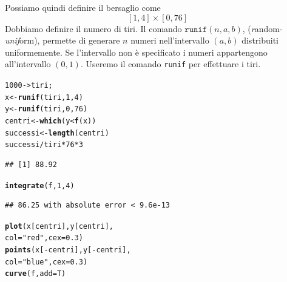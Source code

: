 \documentclass[onecolumn,11pt]{book}\usepackage[]{graphicx}\usepackage[]{color}
\makeatletter
\newcommand{\hlnum}[1]{\textcolor[rgb]{0.686,0.059,0.569}{#1}}%
\newcommand{\hlstr}[1]{\textcolor[rgb]{0.192,0.494,0.8}{#1}}%
\newcommand{\hlopt}[1]{\textcolor[rgb]{0,0,0}{#1}}%
\newcommand{\hlstd}[1]{\textcolor[rgb]{0.345,0.345,0.345}{#1}}%
\newcommand{\hlkwb}[1]{\textcolor[rgb]{0.69,0.353,0.396}{#1}}%
\newcommand{\hlkwc}[1]{\textcolor[rgb]{0.333,0.667,0.333}{#1}}%
\newcommand{\hlkwd}[1]{\textcolor[rgb]{0.737,0.353,0.396}{\textbf{#1}}}%
\newenvironment{kframe}{%
 \def\at@end@of@kframe{}%
 \ifinner\ifhmode%
  \def\at@end@of@kframe{\end{minipage}}%
  \begin{minipage}{\columnwidth}%
 \fi\fi%
 \def\FrameCommand##1{\hskip\@totalleftmargin \hskip-\fboxsep
 \colorbox{shadecolor}{##1}\hskip-\fboxsep
     \hskip-\linewidth \hskip-\@totalleftmargin \hskip\columnwidth}%
 \MakeFramed {\advance\hsize-\width
   \@totalleftmargin\z@ \linewidth\hsize
   \@setminipage}}%
 {\par\unskip\endMakeFramed%
 \at@end@of@kframe}
\newenvironment{knitrout}{}{} %
\makeatother
\begin{document}
Possiamo quindi definire il bersaglio come
$$[1,4]\times [0,76]$$
Dobbiamo definire il numero di tiri.
Il comando $\texttt{runif}(n,a,b)$, ({\it r}andom-{\it unif}orm), permette di generare $n$ numeri nell'intervallo $(a,b)$ distribuiti uniformemente. Se l'intervallo non \`e specificato i numeri appartengono all'intervallo $(0,1)$.
Useremo il comando  \texttt{runif} per effettuare i tiri.

\par
\begin{knitrout}
\color{fgcolor}\begin{kframe}
\begin{alltt}
\hlnum{1000}\hlkwb{->}\hlstd{tiri;}
\hlstd{x}\hlkwb{<-}\hlkwd{runif}\hlstd{(tiri,}\hlnum{1}\hlstd{,}\hlnum{4}\hlstd{)}
\hlstd{y}\hlkwb{<-}\hlkwd{runif}\hlstd{(tiri,}\hlnum{0}\hlstd{,}\hlnum{76}\hlstd{)}
\hlstd{centri}\hlkwb{<-}\hlkwd{which}\hlstd{(y}\hlopt{<}\hlkwd{f}\hlstd{(x))}
\hlstd{successi}\hlkwb{<-}\hlkwd{length}\hlstd{(centri)}
\hlstd{successi}\hlopt{/}\hlstd{tiri}\hlopt{*}\hlnum{76}\hlopt{*}\hlnum{3}
\end{alltt}
\begin{verbatim}
## [1] 88.92
\end{verbatim}
\begin{alltt}
\hlkwd{integrate}\hlstd{(f,}\hlnum{1}\hlstd{,}\hlnum{4}\hlstd{)}
\end{alltt}
\begin{verbatim}
## 86.25 with absolute error < 9.6e-13
\end{verbatim}
\begin{alltt}
\hlkwd{plot}\hlstd{(x[centri],y[centri],}
\hlkwc{col}\hlstd{=}\hlstr{"red"}\hlstd{,}\hlkwc{cex}\hlstd{=}\hlnum{0.3}\hlstd{)}
\hlkwd{points}\hlstd{(x[}\hlopt{-}\hlstd{centri],y[}\hlopt{-}\hlstd{centri],}
\hlkwc{col}\hlstd{=}\hlstr{"blue"}\hlstd{,}\hlkwc{cex}\hlstd{=}\hlnum{0.3}\hlstd{)}
\hlkwd{curve}\hlstd{(f,}\hlkwc{add}\hlstd{=T)}
\end{alltt}
\end{kframe}
\end{knitrout}
\end{document}
